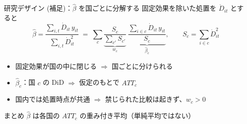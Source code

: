 \documentclass[aspectratio=169,11pt]{beamer}
\begin{document}
\begin{frame}{研究デザイン (補足)：$\hat\beta$ を国ごとに分解する}
  固定効果を除いた処置を $\dot D_{it}$ とすると
  \[
    \hat\beta = \frac{\sum_{i,t}\dot D_{it}\,y_{it}}{\sum_{i,t}\dot D_{it}^2}
    \;=\; \sum_c \underbrace{\frac{S_c}{\sum_{c'} S_{c'}}}_{w_c}\;
    \underbrace{\frac{\sum_{i\in c}\dot D_{it}\,y_{it}}{S_c}}_{\hat\beta_c},
    \qquad S_c = \sum_{i\in c}\dot D_{it}^2
  \]
  \vspace{0.3em}
  \begin{itemize}
    \item 固定効果が国の中に閉じる $\Rightarrow$ 国ごとに分けられる
    \item $\hat\beta_c$：国 $c$ の DiD $\Rightarrow$ 仮定のもとで $ATT_c$
    \item 国内では処置時点が共通 $\Rightarrow$ \alert{禁じられた比較は起きず}、$w_c>0$
  \end{itemize}
  \vspace{0.3em}
  \begin{block}{まとめ}
    $\hat\beta$ は各国の $ATT_c$ の重み付き平均（単純平均ではない）
  \end{block}
\end{frame}
\end{document}

